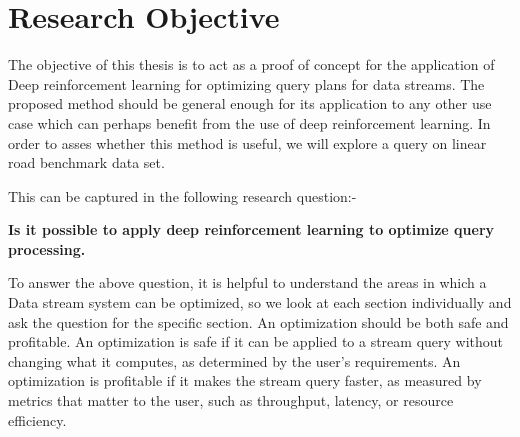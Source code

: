 \section{Research Objective}
The objective of this thesis is to act as a proof of concept for the application of Deep reinforcement learning for optimizing query plans for data streams. The proposed method should be general enough for its application to any other use case which can perhaps benefit from the use of deep reinforcement learning. In order to asses whether this method is useful, we will explore a query on linear road benchmark data set.
\par  This can be captured in the following research question:-
\begin{center}
    \textbf{Is it possible to apply deep reinforcement learning to optimize query processing.}
\end{center}
To answer the above question, it is helpful to understand the areas in which a Data stream system can be optimized, so we look at each section individually and ask the question for the specific section. An optimization should be both safe and profitable. An optimization is safe if it can be applied to a stream query without changing what it computes, as determined by the user’s requirements. An optimization is profitable if it makes the stream query faster, as measured by metrics that matter to the user, such as throughput, latency, or resource efficiency. \cite{stream_query_optimization}

